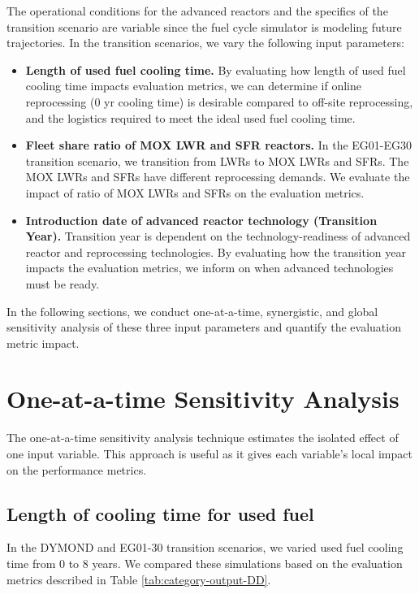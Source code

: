 The operational conditions for the advanced reactors and
the specifics of the transition scenario are variable
since the fuel cycle simulator is modeling future 
trajectories. 
In the transition scenarios, we vary the following 
input parameters: 
\begin{itemize}
    \item \textbf{Length of used fuel cooling time.} By evaluating how length
    of used fuel cooling time impacts evaluation metrics, we can determine 
    if online reprocessing (0 yr cooling time) is desirable compared to off-site
    reprocessing, and the logistics required to meet the ideal used fuel cooling time.
    \item \textbf{Fleet share ratio of MOX LWR and SFR reactors.} 
    In the EG01-EG30 transition scenario, we transition from LWRs to MOX LWRs and SFRs.
    The MOX LWRs and SFRs have different reprocessing demands. We evaluate the impact of ratio of 
    MOX LWRs and SFRs on the evaluation metrics.  
	\item \textbf{Introduction date of advanced reactor technology (Transition Year).}
    Transition year is dependent on the technology-readiness of advanced reactor 
    and reprocessing technologies. By evaluating how the transition year impacts the evaluation 
    metrics, we inform on when advanced technologies must be ready. 
\end{itemize}

In the following sections, 
we conduct one-at-a-time, synergistic, and global
sensitivity analysis of these three input parameters and 
quantify the evaluation metric impact.  

\section{One-at-a-time Sensitivity Analysis}
\label{sec:oat}
The one-at-a-time sensitivity analysis technique estimates 
the isolated effect of one input variable. 
This approach is useful as it gives each variable's local impact 
on the performance metrics. 

\subsection{Length of cooling time for used fuel}
In the DYMOND and \Cyclus EG01-30 transition scenarios, 
we varied used fuel cooling time from 0 to 8 years. 
We compared these simulations based on the evaluation 
metrics described in Table \ref{tab:category-output-DD}.

